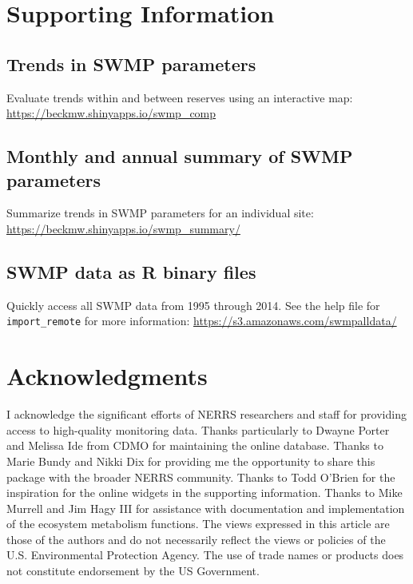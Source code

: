 \documentclass[10pt,letterpaper]{article}\usepackage[]{graphicx}\usepackage[]{color}
\begin{document}
\section*{Supporting Information}
\label{supp_info}

\subsection*{Trends in \ac{SWMP} parameters}
\label{swmp_trends}
Evaluate trends within and between reserves using an interactive map: \href{https://beckmw.shinyapps.io/swmp_comp}{https://beckmw.shinyapps.io/swmp\_comp}

\subsection*{Monthly and annual summary of \ac{SWMP} parameters}
\label{swmp_summary}
Summarize trends in \ac{SWMP} parameters for an individual site: \href{https://beckmw.shinyapps.io/swmp_summary/}{https://beckmw.shinyapps.io/swmp\_summary/} 

\subsection*{\ac{SWMP} data as R binary files}

Quickly access all \ac{SWMP} data from 1995 through 2014. See the help file for \texttt{import\_remote} for more information: \href{https://s3.amazonaws.com/swmpalldata/}{https://s3.amazonaws.com/swmpalldata/}

\section*{Acknowledgments}

I acknowledge the significant efforts of \ac{NERRS} researchers and staff for providing access to high-quality monitoring data.  Thanks particularly to Dwayne Porter and Melissa Ide from \ac{CDMO} for maintaining the online database.  Thanks to Marie Bundy and Nikki Dix for providing me the opportunity to share this package with the broader \ac{NERRS} community.  Thanks to Todd O'Brien for the inspiration for the online widgets in the supporting information. Thanks to Mike Murrell and Jim Hagy III for assistance with documentation and implementation of the ecosystem metabolism functions. The views expressed in this article are those of the authors and do not necessarily reflect the views or policies of the U.S. Environmental Protection Agency.  The use of trade names or products does not constitute endorsement by the US Government.   

\nolinenumbers


\end{document}
